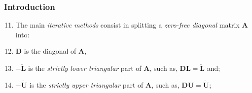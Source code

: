\documentclass[10pt,compress]{beamer}
\begin{document}
\begin{frame}
  \frametitle{Introduction} 
  \begin{enumerate}
  \setcounter{enumi}{10}
     \item <1-> The main {\it iterative methods} consist in splitting a {\it zero-free diagonal} matrix $\bm{A}$ into:
     \item <3-> $\bm{D}$ is the diagonal of $\bm{A}$, 
     \item <4-> $-\tilde{\bm{L}}$ is the {\it strictly lower triangular} part of $\bm{A}$, such as, $\bm{D}\bm{L}=\tilde{\bm{L}}$ and;
     \item <5-> $-\tilde{\bm{U}}$ is the {\it strictly upper triangular} part of $\bm{A}$, such as, $\bm{D}\bm{U}=\tilde{\bm{U}}$;
  \end{enumerate}
\end{frame}
\end{document}
